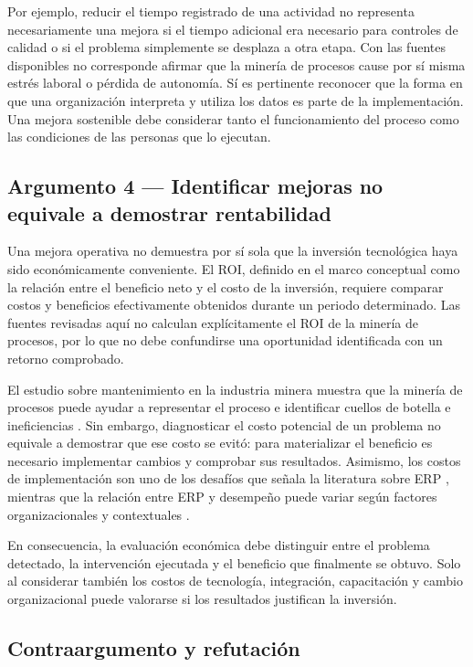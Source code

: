 \documentclass{article}
\begin{document}
    Por ejemplo, reducir el tiempo registrado de una actividad no representa necesariamente una mejora si el tiempo adicional era necesario para controles de calidad o si el problema simplemente se desplaza a otra etapa. Con las fuentes disponibles no corresponde afirmar que la minería de procesos cause por sí misma estrés laboral o pérdida de autonomía. Sí es pertinente reconocer que la forma en que una organización interpreta y utiliza los datos es parte de la implementación. Una mejora sostenible debe considerar tanto el funcionamiento del proceso como las condiciones de las personas que lo ejecutan.

    \subsection{Argumento 4 — Identificar mejoras no equivale a demostrar rentabilidad}

    Una mejora operativa no demuestra por sí sola que la inversión tecnológica haya sido económicamente conveniente. El ROI, definido en el marco conceptual como la relación entre el beneficio neto y el costo de la inversión, requiere comparar costos y beneficios efectivamente obtenidos durante un periodo determinado. Las fuentes revisadas aquí no calculan explícitamente el ROI de la minería de procesos, por lo que no debe confundirse una oportunidad identificada con un retorno comprobado.

    El estudio sobre mantenimiento en la industria minera muestra que la minería de procesos puede ayudar a representar el proceso e identificar cuellos de botella e ineficiencias \cite{miningindustry2023}. Sin embargo, diagnosticar el costo potencial de un problema no equivale a demostrar que ese costo se evitó: para materializar el beneficio es necesario implementar cambios y comprobar sus resultados. Asimismo, los costos de implementación son uno de los desafíos que señala la literatura sobre ERP \cite{talo2025erp}, mientras que la relación entre ERP y desempeño puede variar según factores organizacionales y contextuales \cite{erpimpact2024}.

    En consecuencia, la evaluación económica debe distinguir entre el problema detectado, la intervención ejecutada y el beneficio que finalmente se obtuvo. Solo al considerar también los costos de tecnología, integración, capacitación y cambio organizacional puede valorarse si los resultados justifican la inversión.

    \subsection{Contraargumento y refutación}
\end{document}
